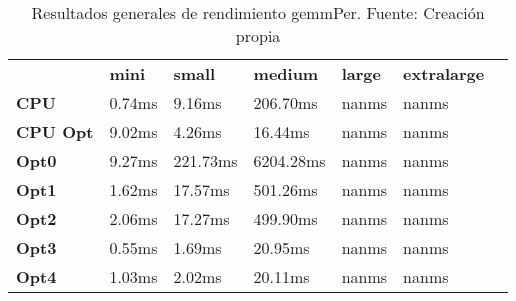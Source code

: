 \begin{table}[H]
    \centering
    \begin{tabular}{lllllll}
    \rowcolor[HTML]{DAE8FC} \ &  \textbf{mini} &  \textbf{small} &  \textbf{medium} &  \textbf{	large} &  \textbf{	extralarge} \\
    \cellcolor[HTML]{DAE8FC} \textbf{CPU} & 0.74ms & 9.16ms & 206.70ms & 	nanms & 	nanms \\
    \rowcolor[HTML]{EFEFEF} \cellcolor[HTML]{DAE8FC} \textbf{CPU Opt} & 9.02ms & 4.26ms & 16.44ms & 	nanms & 	nanms \\
    \cellcolor[HTML]{DAE8FC} \textbf{Opt0} & 9.27ms & 221.73ms & 6204.28ms & 	nanms & 	nanms \\
    \rowcolor[HTML]{EFEFEF} \cellcolor[HTML]{DAE8FC} \textbf{Opt1} & 1.62ms & 17.57ms & 501.26ms & 	nanms & 	nanms \\
    \cellcolor[HTML]{DAE8FC} \textbf{Opt2} & 2.06ms & 17.27ms & 499.90ms & 	nanms & 	nanms \\
    \rowcolor[HTML]{EFEFEF} \cellcolor[HTML]{DAE8FC} \textbf{Opt3} & 0.55ms & 1.69ms & 20.95ms & 	nanms & 	nanms \\
    \cellcolor[HTML]{DAE8FC} \textbf{Opt4} & 1.03ms & 2.02ms & 20.11ms & 	nanms & 	nanms \\
    \end{tabular}
    \caption[Resultados generales de rendimiento gemmPer]{{Resultados generales de rendimiento gemmPer. Fuente: Creación propia}}
    \label{table_global_gemmPer_PerformanceResults_data}
\end{table}